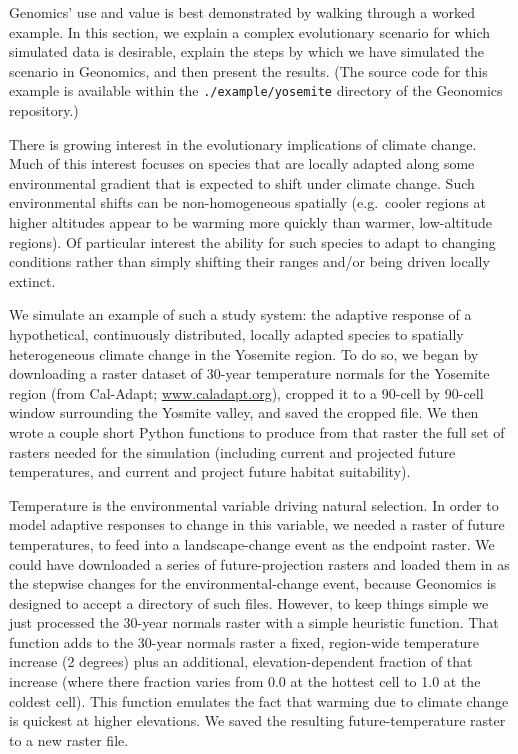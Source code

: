﻿\documentclass{article}
\begin{document}
Genomics' use and value is best demonstrated by walking through a worked example.
In this section, we explain a complex evolutionary scenario for which 
simulated data is desirable, explain the steps by which we have simulated the
scenario in Geonomics, and then present the results.
(The source code for this example is available within the
\texttt{./example/yosemite} directory of the Geonomics repository.)

There is growing interest in the evolutionary implications of climate change.
Much of this interest focuses on species that are locally adapted along some
environmental gradient that is expected to shift under climate change.
Such environmental shifts can be non-homogeneous spatially
(e.g.\ cooler regions at higher altitudes appear to be warming more
quickly than warmer, low-altitude regions).
Of particular interest the ability for such species to adapt
to changing conditions rather than simply shifting their ranges
and/or being driven locally extinct.

We simulate an example of such a study system: the adaptive
response of a hypothetical, continuously distributed, locally adapted species
to spatially heterogeneous climate change in the Yosemite region.
To do so, we began by downloading a raster dataset of 30-year
temperature normals for the Yosemite region (from Cal-Adapt; \url{www.caladapt.org}),
cropped it to a 90-cell by 90-cell window surrounding the Yosmite valley,
and saved the cropped file.
We then wrote a couple short Python functions to produce from that raster
the full set of rasters needed for the simulation
(including current and projected future temperatures,
and current and project future habitat suitability).

Temperature is the environmental variable driving natural selection. 
In order to model adaptive responses to change in this variable,
we needed a raster of future temperatures,
to feed into a landscape-change event as the endpoint raster.
We could have downloaded a series of future-projection rasters and loaded
them in as the stepwise changes for the environmental-change event,
because Geonomics is designed to accept a directory of such files.
However, to keep things simple we just processed the 30-year normals raster
with a simple heuristic function.
That function adds to the 30-year normals raster a fixed, region-wide
temperature increase (2 degrees) plus an additional, elevation-dependent fraction
of that increase (where there fraction varies from
0.0 at the hottest cell to 1.0 at the coldest cell).
This function emulates the fact that warming due to climate change is quickest at higher elevations.
We saved the resulting future-temperature raster to a new raster file.
\end{document}
